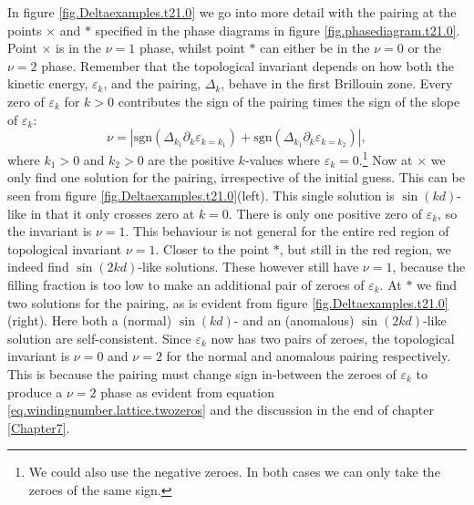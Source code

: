 In figure \ref{fig.Deltaexamples.t21.0} we go into more detail with the pairing at the points $\times$ and $*$ specified in the phase diagrams in figure \ref{fig.phasediagram.t21.0}. Point $\times$ is in the $\nu = 1$ phase, whilst point $*$ can either be in the $\nu = 0$ or the $\nu = 2$ phase. Remember that the topological invariant depends on how both the kinetic energy, $\varepsilon_k$, and the pairing, $\Delta_k$, behave in the first Brillouin zone. Every zero of $\varepsilon_k$ for $k > 0$ contributes the sign of the pairing times the sign of the slope of $\varepsilon_k$:
\begin{equation}
\nu = \left| \text{sgn}\left(\Delta_{k_1}\partial_k\varepsilon_{k = k_1}\right) + \text{sgn}\left(\Delta_{k_1}\partial_k\varepsilon_{k = k_2}\right)\right|, 
\label{eq.windingnumber.lattice.twozeros}
\end{equation}
where $k_1 > 0$ and $k_2 > 0$ are the positive $k$-values where $\varepsilon_k = 0$.\footnote{We could also use the negative zeroes. In both cases we can only take the zeroes of the same sign.} Now at $\times$ we only find one solution for the pairing, irrespective of the initial guess. This can be seen from figure \ref{fig.Deltaexamples.t21.0}(left). This single solution is $\sin(kd)$-like in that it only crosses zero at $k = 0$. There is only one positive zero of $\varepsilon_k$, so the invariant is $\nu = 1$. This behaviour is not general for the entire red region of topological invariant $\nu = 1$. Closer to the point $*$, but still in the red region, we indeed find $\sin(2kd)$-like solutions. These however still have $\nu = 1$, because the filling fraction is too low to make an additional pair of zeroes of $\varepsilon_k$. At $*$ we find two solutions for the pairing, as is evident from figure \ref{fig.Deltaexamples.t21.0}(right). Here both a (normal) $\sin(kd)$- and an (anomalous) $\sin(2kd)$-like solution are self-consistent. Since $\varepsilon_k$ now has two pairs of zeroes, the topological invariant is $\nu = 0$ and $\nu = 2$ for the normal and anomalous pairing respectively. This is because the pairing must change sign in-between the zeroes of $\varepsilon_k$ to produce a $\nu = 2$ phase as evident from equation \eqref{eq.windingnumber.lattice.twozeros} and the discussion in the end of chapter \ref{Chapter7}. 

